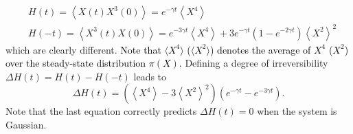 \documentclass[12pt]{iopart}
\newcommand{\lx} {\left}
\newcommand{\rx} {\right}
\newcommand{\ave}[1] {\lx\langle #1 \rx\rangle}
\begin{document}
\begin{align}
&H(t)=\ave{X(t)X^3(0)}=e^{-\gamma t}\ave{X^4}\\
&H(-t)=\ave{X^3(t)X(0)}=e^{-3\gamma t}\ave{X^4}+3e^{-\gamma t}\lx(1-e^{-2\gamma t}\rx)\ave{X^2}^2
\end{align}
which are clearly different. \textcolor{black}{Note that $\langle X^4 \rangle$ ($\langle X^2 \rangle$) denotes the average of $X^4$ ($ X^2$) over the steady-state distribution $\pi(X)$.} Defining a degree of irreversibility $\Delta H (t)=H(t)-H(-t)$ leads to 
\begin{equation}
    \Delta H (t) = \lx(\ave{X^4}-3\ave{X^2}^2\rx)\lx(e^{-\gamma t}-e^{-3\gamma t}\rx).
\end{equation}
Note that the last equation correctly predicts $\Delta H(t)=0$ when the system is Gaussian.
\end{document}

